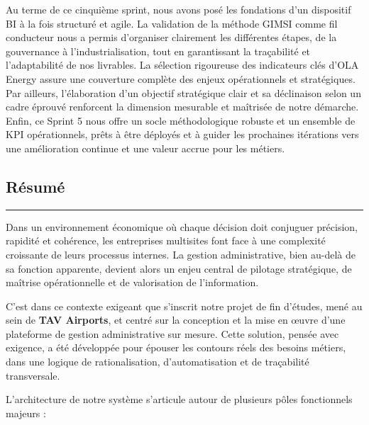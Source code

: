 \documentclass[a4paper,11pt]{report}
\begin{document}
Au terme de ce cinquième sprint, nous avons posé les fondations d’un dispositif BI à la fois structuré et agile. La validation de la méthode GIMSI comme fil conducteur nous a permis d’organiser clairement les différentes étapes, de la gouvernance à l’industrialisation, tout en garantissant la traçabilité et l’adaptabilité de nos livrables. La sélection rigoureuse des indicateurs clés d’OLA Energy assure une couverture complète des enjeux opérationnels et stratégiques. Par ailleurs, l’élaboration d’un objectif stratégique clair et sa déclinaison selon un cadre éprouvé renforcent la dimension mesurable et maîtrisée de notre démarche. Enfin, ce Sprint 5 nous offre un socle méthodologique robuste et un ensemble de KPI opérationnels, prêts à être déployés et à guider les prochaines itérations vers une amélioration continue et une valeur accrue pour les métiers.  


\thispagestyle{empty}
\begin{center}
    \vspace{0.5cm}
    \chapter*{Résumé}

    \vspace{0.5cm}
    \rule{\linewidth}{0.5pt}
\end{center}

\vspace{0.8cm}

\noindent
Dans un environnement économique où chaque décision doit conjuguer précision, rapidité et cohérence, les entreprises multisites font face à une complexité croissante de leurs processus internes. La gestion administrative, bien au-delà de sa fonction apparente, devient alors un enjeu central de pilotage stratégique, de maîtrise opérationnelle et de valorisation de l'information.

\vspace{0.4cm}
\noindent
C’est dans ce contexte exigeant que s’inscrit notre projet de fin d’études, mené au sein de \textbf{TAV Airports}, et centré sur la conception et la mise en œuvre d’une plateforme de gestion administrative sur mesure. Cette solution, pensée avec exigence, a été développée pour épouser les contours réels des besoins métiers, dans une logique de rationalisation, d’automatisation et de traçabilité transversale.

\vspace{0.4cm}
\noindent
L’architecture de notre système s’articule autour de plusieurs pôles fonctionnels majeurs :
\end{document}
